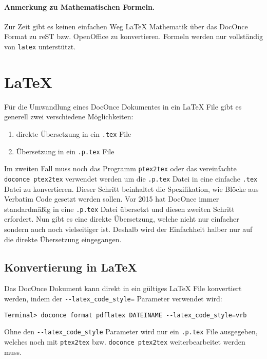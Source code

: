 \documentclass[%
oneside,                 %
final,                   %
chapterprefix=true,      %
open=right,              %
10pt]{book}
\begin{document}
\paragraph{ Anmerkung zu Mathematischen Formeln.}
Zur Zeit gibt es keinen einfachen Weg {\LaTeX} Mathematik über das DocOnce Format zu reST bzw. OpenOffice zu konvertieren. Formeln werden nur vollständig von \texttt{latex} unterstützt.

\section{{\LaTeX}}
Für die Umwandlung eines DocOnce Dokumentes in ein {\LaTeX} File gibt es generell zwei verschiedene Möglichkeiten:
\begin{enumerate}
\item direkte Übersetzung in ein \texttt{.tex} File

\item Übersetzung in ein \texttt{.p.tex} File
\end{enumerate}

\noindent
Im zweiten Fall muss noch das Programm \texttt{ptex2tex} oder das vereinfachte \texttt{doconce ptex2tex} verwendet werden um die \texttt{.p.tex} Datei in eine einfache \texttt{.tex} Datei zu konvertieren. Dieser Schritt beinhaltet die Spezifikation, wie Blöcke aus Verbatim Code gesetzt werden sollen. Vor 2015 hat DocOnce immer standardmäßig in eine \texttt{.p.tex} Datei übersetzt und diesen zweiten Schritt erfordert. Nun gibt es eine direkte Übersetzung, welche nicht nur einfacher sondern auch noch vielseitiger ist. Deshalb wird der Einfachheit halber nur auf die direkte Übersetzung eingegangen.
\subsection{Konvertierung in {\LaTeX}}
Das DocOnce Dokument kann direkt in ein gültiges {\LaTeX} File konvertiert werden, indem der \Verb!--latex_code_style=! Parameter verwendet wird:
\begin{verbatim}
Terminal> doconce format pdflatex DATEINAME --latex_code_style=vrb
\end{verbatim}
Ohne den \Verb!--latex_code_style! Parameter wird nur ein \texttt{.p.tex} File ausgegeben, welches noch mit \texttt{ptex2tex} bzw. \texttt{doconce ptex2tex} weiterbearbeitet werden muss.
\end{document}
